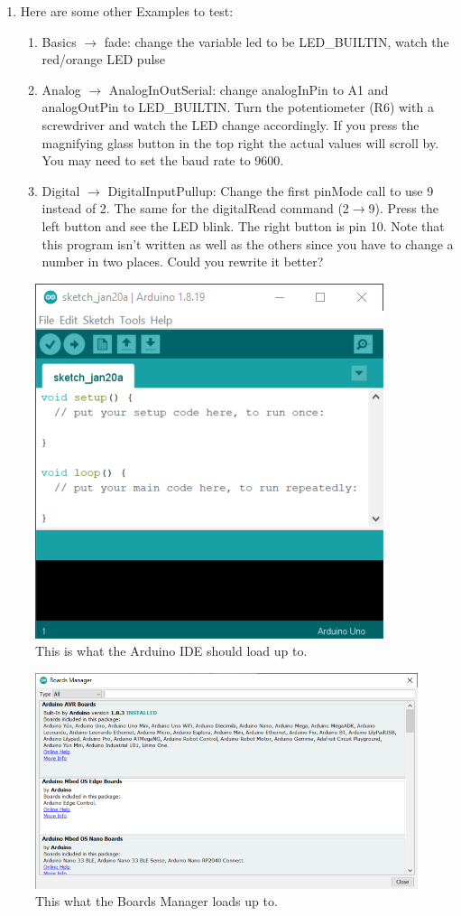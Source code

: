 \begin{enumerate}
	\item Here are some other Examples to test:
	\begin{enumerate}
		\item Basics $\rightarrow$ fade: change the variable led to be LED\_BUILTIN, watch the red/orange LED pulse
		\item Analog $\rightarrow$ AnalogInOutSerial: change analogInPin to A1 and analogOutPin to LED\_BUILTIN. Turn 
				the potentiometer (R6) with a screwdriver and watch the LED change accordingly. If you press the magnifying
				glass button in the top right the actual values will scroll by. You may need to set the baud rate to 9600.
		\item Digital $\rightarrow$ DigitalInputPullup: Change the first pinMode call to use 9 instead of 2. The same for 
				the digitalRead command (2$\rightarrow$9). Press the left button and see the LED blink. The right button is 
				pin 10. Note that this program isn't written as well as the others since you have to change a number in two
				places. Could you rewrite it better?
	\end{enumerate}
\end{enumerate}

\begin{figure}[!htb]
	\centering
	\includegraphics[scale=1.0]{arduinoStart/emptysketch.PNG}
	\caption{This is what the Arduino IDE should load up to.}
	\label{fig:emptysketch}
\end{figure} 

\begin{figure}[!htb]
	\centering
	\includegraphics[scale=0.9]{arduinoStart/BoardsManager.PNG}
	\caption{This what the Boards Manager loads up to.}
	\label{fig:boardsManager}
\end{figure} 

